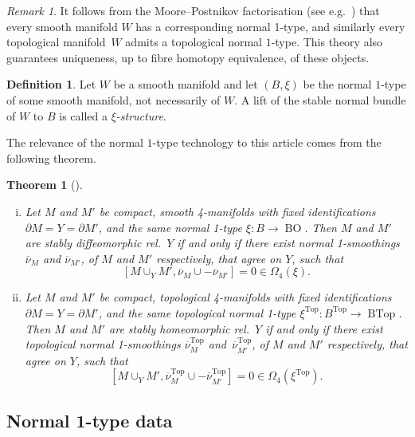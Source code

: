 \documentclass[a4paper, reqno]{amsart}
\newtheorem{theorem}[proposition]{Theorem}
\theoremstyle{definition}
\newtheorem{definition}[proposition]{Definition}
\theoremstyle{remark}
\newtheorem{remark}[proposition]{Remark}
\DeclareMathOperator{\BTop}{BTop}
\newcommand{\Top}{\mathrm{Top}}
\DeclareMathOperator{\BO}{BO}
\begin{document}
\begin{remark}
    It follows from the Moore--Postnikov factorisation (see e.g.~\cite{zbMATH03562120}) that every smooth manifold $W$ has a corresponding normal 1-type, and similarly every topological manifold~$W$ admits a topological normal $1$-type. This theory also guarantees uniqueness, up to fibre homotopy equivalence, of these objects.
\end{remark}

\begin{definition}\label{defn:xi-structure}
    Let $W$ be a smooth manifold and let $(B,\xi)$ be the normal $1$-type of some smooth manifold, not necessarily of $W$. A lift of the stable normal bundle of $W$ to $B$ is called a \emph{$\xi$-structure}.
\end{definition}

The relevance of the normal $1$-type technology to this article comes from the following theorem.

\begin{theorem}[]
\label{thm:kreckstable1type}\leavevmode
  \begin{enumerate}[(i)]
        \item\label{item:kreck-thm-i}  Let $M$ and $M'$ be compact, smooth 4-manifolds with fixed identifications $\partial M = Y =\partial M'$, and the same normal 1-type $\xi \colon B \to \BO$. 
    Then $M$ and $M'$ are stably diffeomorphic rel.\ $Y$ if and only if there exist normal 1-smoothings  $\overline{\nu}_M$ and $\overline{\nu}_{M'}$, of $M$ and $M'$ respectively, that agree on $Y$, such that 
    \[[M \cup_Y M',\overline{\nu}_M \cup - \overline{\nu}_{M'}] = 0 \in \Omega_4(\xi).\]
 \item\label{item:kreck-thm-ii}
  Let $M$ and $M'$ be compact, topological 4-manifolds with fixed identifications $\partial M = Y =\partial M'$, and the same topological normal 1-type $\xi^{\Top} \colon B^{\Top} \to \BTop$.
 Then $M$ and $M'$ are stably homeomorphic rel.\ $Y$ if and only if there exist topological normal 1-smoothings  $\overline{\nu}_M^{\Top}$ and~$\overline{\nu}_{M'}^{\Top}$, of $M$ and $M'$ respectively, that agree on $Y$, such that 
    \[[M \cup_Y M',\overline{\nu}_M^{\Top} \cup - \overline{\nu}_{M'}^{\Top}] = 0 \in \Omega_4(\xi^{\Top}).\]
   \end{enumerate}
 \end{theorem}

\subsection{Normal 1-type data}\label{subsec:normal-1type-date}
\end{document}
